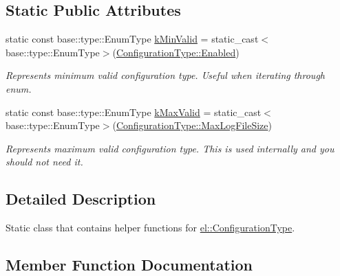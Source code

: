 \subsection*{Static Public Attributes}
\begin{DoxyCompactItemize}
\item 
static const base\+::type\+::\+Enum\+Type \hyperlink{classel_1_1ConfigurationTypeHelper_ab7266e698eb32dec2da285325a66e322}{k\+Min\+Valid} = static\+\_\+cast$<$base\+::type\+::\+Enum\+Type$>$(\hyperlink{namespaceel_a281f5db6d6163678bc68a8b23b59e124a00d23a76e43b46dae9ec7aa9dcbebb32}{Configuration\+Type\+::\+Enabled})\hypertarget{classel_1_1ConfigurationTypeHelper_ab7266e698eb32dec2da285325a66e322}{}\label{classel_1_1ConfigurationTypeHelper_ab7266e698eb32dec2da285325a66e322}

\begin{DoxyCompactList}\small\item\em Represents minimum valid configuration type. Useful when iterating through enum. \end{DoxyCompactList}\item 
static const base\+::type\+::\+Enum\+Type \hyperlink{classel_1_1ConfigurationTypeHelper_aa02f3cefb127e7eb97d7e1dd7f51a12d}{k\+Max\+Valid} = static\+\_\+cast$<$base\+::type\+::\+Enum\+Type$>$(\hyperlink{namespaceel_a281f5db6d6163678bc68a8b23b59e124a4b35e615142d60db6383426f051e700b}{Configuration\+Type\+::\+Max\+Log\+File\+Size})\hypertarget{classel_1_1ConfigurationTypeHelper_aa02f3cefb127e7eb97d7e1dd7f51a12d}{}\label{classel_1_1ConfigurationTypeHelper_aa02f3cefb127e7eb97d7e1dd7f51a12d}

\begin{DoxyCompactList}\small\item\em Represents maximum valid configuration type. This is used internally and you should not need it. \end{DoxyCompactList}\end{DoxyCompactItemize}


\subsection{Detailed Description}
Static class that contains helper functions for \hyperlink{namespaceel_a281f5db6d6163678bc68a8b23b59e124}{el\+::\+Configuration\+Type}. 

\subsection{Member Function Documentation}
